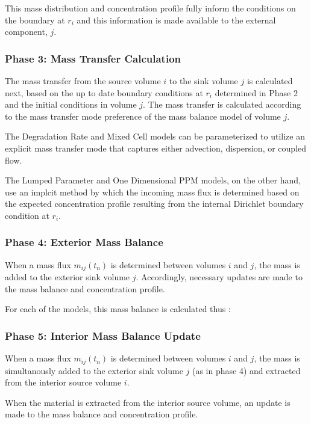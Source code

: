 This mass distribution and concentration profile fully inform 
the conditions on the boundary at $r_i$ and this information is made available 
to the external component, $j$.


\subsubsection{Phase 3: Mass Transfer Calculation}

The mass transfer from the source volume $i$ to the sink volume $j$ is 
calculated next, based on the up to date boundary conditions at $r_i$ 
determined in Phase 2 and the initial conditions in volume $j$. The mass 
transfer is calculated according to the mass transfer mode preference of the 
mass balance model of volume $j$.  

The Degradation Rate and Mixed Cell models can be parameterized to utilize an 
explicit mass transfer mode that captures either advection, dispersion, or coupled flow. 

The Lumped Parameter and One Dimensional PPM models, on the other hand, use an 
implcit method by which the incoming mass flux is determined based on the 
expected concentration profile resulting from the internal 
Dirichlet boundary condition at $r_i$. 

\subsubsection{Phase 4: Exterior Mass Balance}

When a mass flux $m_{ij}(t_n)$ is determined between volumes $i$ and $j$, the 
mass is added to the exterior sink volume $j$. Accordingly, necessary updates 
are made to the mass balance and concentration profile. 

For each of the models, this mass balance is calculated thus :



\subsubsection{Phase 5: Interior Mass Balance Update}
When a mass flux $m_{ij}(t_n)$ is determined between volumes $i$ and $j$, the 
mass is simultanously added to the exterior sink volume $j$ (as in phase 4) and 
extracted from the interior source volume $i$.

When the material is extracted from the interior source volume, an update is 
made to the mass balance and concentration profile.

